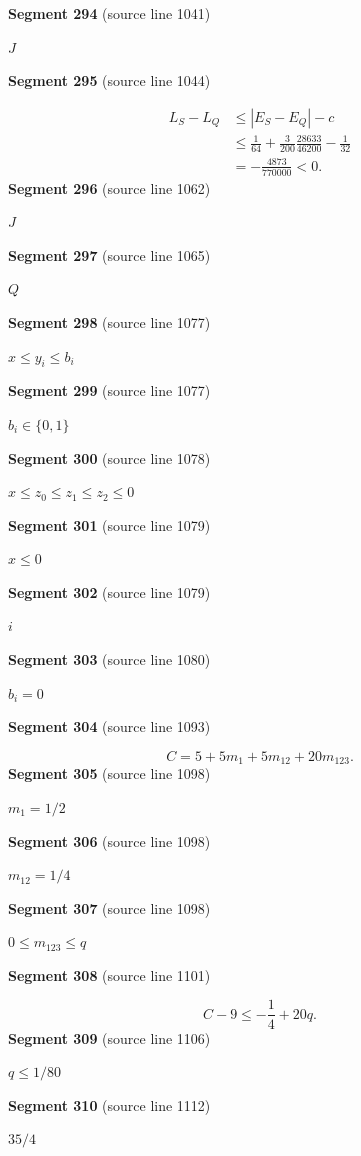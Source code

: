 \documentclass[11pt]{article}
\begin{document}
\textbf{Segment 294} (source line 1041)\par
\( J \)\par
\textbf{Segment 295} (source line 1044)\par
\[
\begin{aligned}
L_S-L_Q
&\le |E_S-E_Q|-c\\
&\le \frac1{64}
  +\frac3{200}\frac{28633}{46200}
  -\frac1{32}\\
&=-\frac{4873}{770000}<0.
\end{aligned}
\tag{22}
\]
\textbf{Segment 296} (source line 1062)\par
\( J \)\par
\textbf{Segment 297} (source line 1065)\par
\( Q \)\par
\textbf{Segment 298} (source line 1077)\par
\( x\le y_i\le b_i \)\par
\textbf{Segment 299} (source line 1077)\par
\( b_i\in\{0,1\} \)\par
\textbf{Segment 300} (source line 1078)\par
\( x\le z_0\le z_1\le z_2\le0 \)\par
\textbf{Segment 301} (source line 1079)\par
\( x\le0 \)\par
\textbf{Segment 302} (source line 1079)\par
\( i \)\par
\textbf{Segment 303} (source line 1080)\par
\( b_i=0 \)\par
\textbf{Segment 304} (source line 1093)\par
\[
C=5+5m_1+5m_{12}+20m_{123}.
\]
\textbf{Segment 305} (source line 1098)\par
\( m_1=1/2 \)\par
\textbf{Segment 306} (source line 1098)\par
\( m_{12}=1/4 \)\par
\textbf{Segment 307} (source line 1098)\par
\( 0\le m_{123}\le q \)\par
\textbf{Segment 308} (source line 1101)\par
\[
C-9\le-\frac14+20q.
\tag{23}
\]
\textbf{Segment 309} (source line 1106)\par
\( q\le1/80 \)\par
\textbf{Segment 310} (source line 1112)\par
\( 35/4 \)\par
\end{document}
